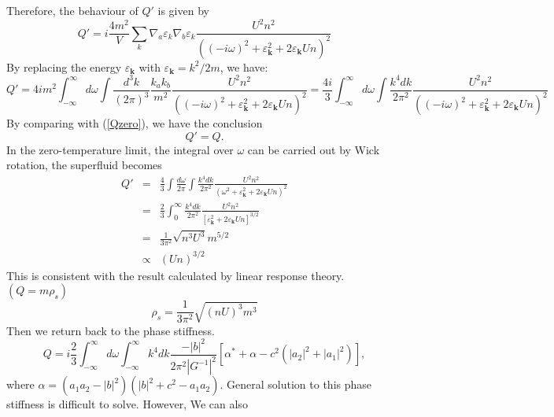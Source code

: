 \documentclass[aps,onecolumn,superscriptaddress,notitlepage,longbibliography]{revtex4-1}
\begin{document}
Therefore, the behaviour of $Q'$ is given by
\begin{equation}
  Q' = i\frac{4 m^2}{ V} \sum_k \nabla_a \varepsilon_k \nabla_b
  \varepsilon_k \frac{U^2 n^2}{((-i\omega)^2 + \varepsilon_{\mathbf{k}}^2 + 2
  \varepsilon_{\mathbf{k}} U n)^2}
\end{equation}
By replacing the energy $\varepsilon_{\mathbf{k}}$ with
$\varepsilon_{\mathbf{k}} = k^2 / 2 m$, we have:
\begin{equation}
  Q' = 4i m^2 \int_{-\infty}^{\infty}d\omega \int \frac{d^3 k}{(2 \pi)^3} \frac{k_a
  k_b}{m^2} \frac{U^2 n^2}{((-i\omega)^2 + \varepsilon_{\mathbf{k}}^2 + 2
  \varepsilon_{\mathbf{k}} U n)^2} = \frac{4i}{3} \int_{-\infty}^{\infty}d\omega \int \frac{k^4
  d k}{2 \pi^2} \frac{U^2 n^2}{((-i\omega)^2 + \varepsilon_{\mathbf{k}}^2 + 2
  \varepsilon_{\mathbf{k}} U n)^2}
\end{equation}
By comparing with (\ref{Qzero}), we have the conclusion
\begin{equation}
  Q' = Q.
\end{equation}
In the zero-temperature limit, the integral over $\omega$ can be carried out by Wick rotation, the superfluid becomes
\begin{eqnarray}
  Q' & = & \frac{4}{3} \int \frac{d \omega}{2 \pi} \int \frac{k^4 d k}{2
  \pi^2} \frac{U^2 n^2}{(\omega^2 + \varepsilon_{\mathbf{k}}^2 + 2
  \varepsilon_{\mathbf{k}} U n)^2} \nonumber\\
  & = & \frac{2}{3} \int_0^{\infty} \frac{k^4 d k}{2 \pi^2} \frac{U^2
  n^2}{[\varepsilon_{\mathbf{k}}^2 + 2 \varepsilon_{\mathbf{k}} U n]^{3 /
  2}} \nonumber\\
  & = & \frac{1}{3 \pi^2} \sqrt{n^3 U^3} m^{5 / 2} \nonumber\\
  & \propto & (U n)^{3 / 2} \label{QQ} 
\end{eqnarray}
This is consistent with the result calculated by linear response theory.$(Q =
m \rho_s)$
\begin{equation}
  \rho_s = \frac{1}{3 \pi^2} \sqrt{(n U)^3 m^3}
\end{equation}
Then we return back to the phase stiffness.
\begin{equation}
  Q = i\frac{2}{3 } \int_{-\infty}^{\infty}d\omega \int_{- \infty}^{\infty} k^4 d k \frac{- | b
  |^2}{2 \pi^2 | G^{- 1} |^2} [\alpha^{\ast} + \alpha - c^2 (| a_2 |^2 + | a_1
  |^2)],
\end{equation}
where $\alpha = (a_1 a_2 - | b |^2) (| b |^2 + c^2 - a_1 a_2)$. General
solution to this phase stiffness is difficult to solve. However, We can also
\end{document}
